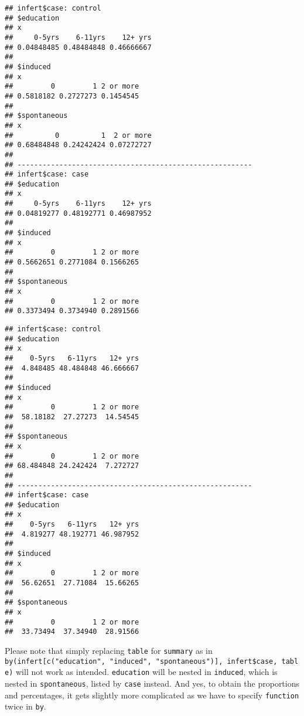 \documentclass[]{book}
\newenvironment{Shaded}{\begin{snugshade}}{\end{snugshade}}
\newcommand{\KeywordTok}[1]{\textcolor[rgb]{0.13,0.29,0.53}{\textbf{{#1}}}}
\newcommand{\DecValTok}[1]{\textcolor[rgb]{0.00,0.00,0.81}{{#1}}}
\newcommand{\StringTok}[1]{\textcolor[rgb]{0.31,0.60,0.02}{{#1}}}
\newcommand{\NormalTok}[1]{{#1}}
\theoremstyle{definition}
\theoremstyle{definition}
\theoremstyle{remark}
\begin{document}
\begin{verbatim}
## infert$case: control
## $education
## x
##     0-5yrs    6-11yrs    12+ yrs 
## 0.04848485 0.48484848 0.46666667 
## 
## $induced
## x
##         0         1 2 or more 
## 0.5818182 0.2727273 0.1454545 
## 
## $spontaneous
## x
##          0          1  2 or more 
## 0.68484848 0.24242424 0.07272727 
## 
## -------------------------------------------------------- 
## infert$case: case
## $education
## x
##     0-5yrs    6-11yrs    12+ yrs 
## 0.04819277 0.48192771 0.46987952 
## 
## $induced
## x
##         0         1 2 or more 
## 0.5662651 0.2771084 0.1566265 
## 
## $spontaneous
## x
##         0         1 2 or more 
## 0.3373494 0.3734940 0.2891566
\end{verbatim}

\begin{Shaded}
\end{Shaded}

\begin{verbatim}
## infert$case: control
## $education
## x
##    0-5yrs   6-11yrs   12+ yrs 
##  4.848485 48.484848 46.666667 
## 
## $induced
## x
##         0         1 2 or more 
##  58.18182  27.27273  14.54545 
## 
## $spontaneous
## x
##         0         1 2 or more 
## 68.484848 24.242424  7.272727 
## 
## -------------------------------------------------------- 
## infert$case: case
## $education
## x
##    0-5yrs   6-11yrs   12+ yrs 
##  4.819277 48.192771 46.987952 
## 
## $induced
## x
##         0         1 2 or more 
##  56.62651  27.71084  15.66265 
## 
## $spontaneous
## x
##         0         1 2 or more 
##  33.73494  37.34940  28.91566
\end{verbatim}

Please note that simply replacing \texttt{table} for \texttt{summary} as
in
\texttt{by(infert{[}c("education",\ "induced",\ "spontaneous"){]},\ infert\$case,\ table)}
will not work as intended. \texttt{education} will be nested in
\texttt{induced}, which is nested in \texttt{spontaneous}, listed by
\texttt{case} instead. And yes, to obtain the proportions and
percentages, it gets slightly more complicated as we have to specify
\texttt{function} twice in \texttt{by}.
\end{document}
